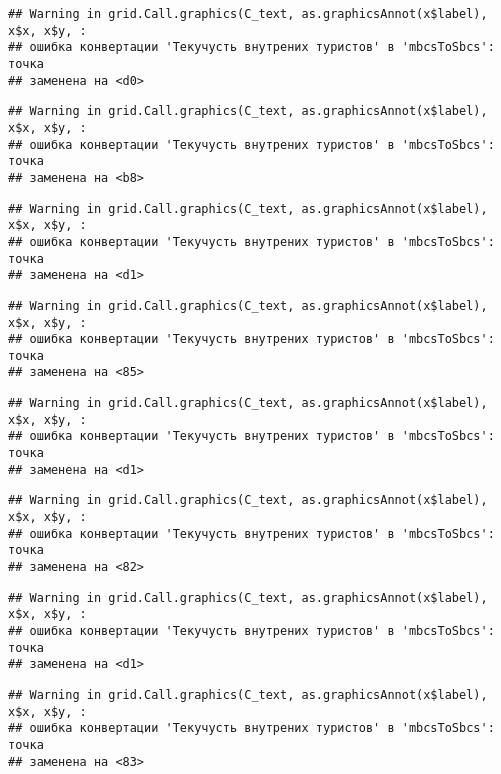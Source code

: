\documentclass[
]{article}
\begin{document}
\begin{verbatim}
## Warning in grid.Call.graphics(C_text, as.graphicsAnnot(x$label), x$x, x$y, :
## ошибка конвертации 'Текучусть внутрених туристов' в 'mbcsToSbcs': точка
## заменена на <d0>
\end{verbatim}

\begin{verbatim}
## Warning in grid.Call.graphics(C_text, as.graphicsAnnot(x$label), x$x, x$y, :
## ошибка конвертации 'Текучусть внутрених туристов' в 'mbcsToSbcs': точка
## заменена на <b8>
\end{verbatim}

\begin{verbatim}
## Warning in grid.Call.graphics(C_text, as.graphicsAnnot(x$label), x$x, x$y, :
## ошибка конвертации 'Текучусть внутрених туристов' в 'mbcsToSbcs': точка
## заменена на <d1>
\end{verbatim}

\begin{verbatim}
## Warning in grid.Call.graphics(C_text, as.graphicsAnnot(x$label), x$x, x$y, :
## ошибка конвертации 'Текучусть внутрених туристов' в 'mbcsToSbcs': точка
## заменена на <85>
\end{verbatim}

\begin{verbatim}
## Warning in grid.Call.graphics(C_text, as.graphicsAnnot(x$label), x$x, x$y, :
## ошибка конвертации 'Текучусть внутрених туристов' в 'mbcsToSbcs': точка
## заменена на <d1>
\end{verbatim}

\begin{verbatim}
## Warning in grid.Call.graphics(C_text, as.graphicsAnnot(x$label), x$x, x$y, :
## ошибка конвертации 'Текучусть внутрених туристов' в 'mbcsToSbcs': точка
## заменена на <82>
\end{verbatim}

\begin{verbatim}
## Warning in grid.Call.graphics(C_text, as.graphicsAnnot(x$label), x$x, x$y, :
## ошибка конвертации 'Текучусть внутрених туристов' в 'mbcsToSbcs': точка
## заменена на <d1>
\end{verbatim}

\begin{verbatim}
## Warning in grid.Call.graphics(C_text, as.graphicsAnnot(x$label), x$x, x$y, :
## ошибка конвертации 'Текучусть внутрених туристов' в 'mbcsToSbcs': точка
## заменена на <83>
\end{verbatim}
\end{document}
